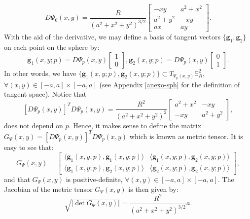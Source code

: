 \begin{equation}
	\label{chp3-eqdistant-dpsi6}
	D\Psi_{6}(x,y) = \frac{R}{{(a^2 + x^2 + y^2)}^{3/2}}
	\begin{bmatrix}
		 -xy  &  a^2+x^2 \\
		 a^2+y^2  &  -xy \\
		 ax &  ay
	\end{bmatrix}.
\end{equation}
With the aid of the derivative, we may define a basis of tangent vectors 
$\{ \boldsymbol{g}_{1}, \boldsymbol{g}_{2} \}$ on each point on the sphere by:
\begin{equation}
	\boldsymbol{g}_{1}(x,y;p) = D\Psi_{p}(x,y)
	\begin{bmatrix}
		 1 \\
		 0
	\end{bmatrix},
	\boldsymbol{g}_{2}(x,y;p) = D\Psi_{p}(x,y)
	\begin{bmatrix}
		 0 \\
		 1
	\end{bmatrix}.
\end{equation}
In other words, we have $\{\boldsymbol{g}_{1}(x,y;p),\boldsymbol{g}_{2}(x,y;p)\} \subset T_{\Psi_p(x,y)}
\mathbb{S}_{R}^2$, $\forall (x,y) \in [-a,a]\times[-a,a]$ (see Appendix \ref{anexo-sph} for the definition of tangent space).
Notice that
\begin{equation}
	\label{chp3-eqdistant-psitensor}
	[D\Psi_{p}(x,y)]^TD\Psi_{p}(x,y)
	= \frac{R^2}{(a^2 + x^2 + y^2)^2}
	\begin{bmatrix}
		 a^2 + x^2 &  -xy \\
		 -xy & a^2 + y^2
	\end{bmatrix},
\end{equation}
does not depend on $p$.
Hence, it makes sense to define the matrix 
$G_{\Psi}(x,y) = [D\Psi_{p}(x,y)]^TD\Psi_{p}(x,y)$ 
which is known as metric tensor.
It is easy to see that:
\begin{equation}
	\label{chp3-eqdistant-psi-metric-tensor}
	G_{\Psi}(x,y) = 
	\begin{bmatrix}
		\langle \boldsymbol{g}_{1}(x,y;p), \boldsymbol{g}_{1}(x,y;p) \rangle & 
		\langle \boldsymbol{g}_{1}(x,y;p), \boldsymbol{g}_{2}(x,y;p) \rangle \\
		\langle \boldsymbol{g}_{1}(x,y;p), \boldsymbol{g}_{2}(x,y;p) \rangle  &
		\langle \boldsymbol{g}_{2}(x,y;p), \boldsymbol{g}_{2}(x,y;p) \rangle 
	\end{bmatrix},
\end{equation}
and that $G_{\Psi}(x,y)$ is positive-definite, 
$\forall (x,y) \in [-a,a]\times[-a,a]$.
The Jacobian of the metric tensor $G_{\Psi}(x,y)$ is then given by:
\begin{equation}
	\sqrt{|\det{G_{\Psi}(x,y)}|} = \frac{R^2}{(a^2+x^2+y^2)^{3/2}}a.
\end{equation}
